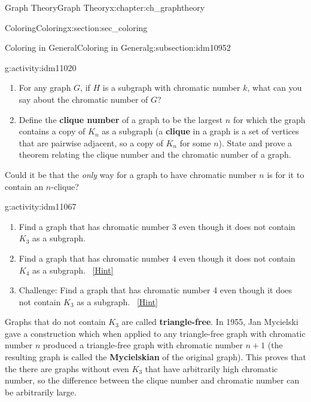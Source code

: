 \documentclass[oneside,10pt,]{book}
\newcommand{\terminology}[1]{\textbf{#1}}
\numberwithin{equation}{chapter}
\newcommand{\vtx}[2]{node[fill,circle,inner sep=0pt, minimum size=4pt,label=#1:#2]{}}
\renewcommand{\v}{\vtx{above}{}}
\begin{document}
\begin{chapterptx}{Graph Theory}{}{Graph Theory}{}{}{x:chapter:ch_graphtheory}
\begin{sectionptx}{Coloring}{}{Coloring}{}{}{x:section:sec_coloring}
\begin{subsectionptx}{Coloring in General}{}{Coloring in General}{}{}{g:subsection:idm10952}
\begin{activity}{}{g:activity:idm11020}
\begin{enumerate}[font=\bfseries,label=(\alph*),ref=\alph*]
\begin{sidebyside}{1}{0.375}{0.375}{0}
\begin{sbspanel}{0.25}
{
}%
\end{sbspanel}%
\end{sidebyside}%
\qquad~\hfill{\tiny\hyperlink{g:hint:idm11027-back}{[Hint]}}\item{}For any graph \(G\), if \(H\) is a subgraph with chromatic number \(k\), what can you say about the chromatic number of \(G\)?%
\item{}Define the \terminology{clique number} of a graph to be the largest \(n\) for which the graph contains a copy of \(K_n\) as a subgraph (a \terminology{clique} in a graph is a set of vertices that are pairwise adjacent, so a copy of \(K_n\) for some \(n\)).  State and prove a theorem relating the clique number and the chromatic number of a graph.%
\end{enumerate}
\end{activity}
Could it be that the \emph{only} way for a graph to have chromatic number \(n\) is for it to contain an \(n\)-clique?%
\begin{activity}{}{g:activity:idm11067}%
\begin{enumerate}[font=\bfseries,label=(\alph*),ref=\alph*]
\item{}Find a graph that has chromatic number 3 even though it does not contain \(K_3\) as a subgraph.%
\item{}Find a graph that has chromatic number 4 even though it does not contain \(K_4\) as a subgraph.%
\qquad~\hfill{\tiny\hyperlink{g:hint:idm11079-back}{[Hint]}}\item{}Challenge: Find a graph that has chromatic number 4 even though it does not contain \(K_3\) as a subgraph.%
\qquad~\hfill{\tiny\hyperlink{g:hint:idm11093-back}{[Hint]}}\end{enumerate}
\end{activity}
Graphs that do not contain \(K_3\) are called \terminology{triangle-free}.  In 1955, Jan Mycielski gave a construction which when applied to any triangle-free graph with chromatic number \(n\) produced a triangle-free graph with chromatic number \(n+1\) (the resulting graph is called the \terminology{Mycielskian} of the original graph).  This proves that the there are graphs without even \(K_3\) that have arbitrarily high chromatic number, so the difference between the clique number and chromatic number can be arbitrarily large.%

\end{subsectionptx}
\end{sectionptx}
\end{chapterptx}
\end{document}
